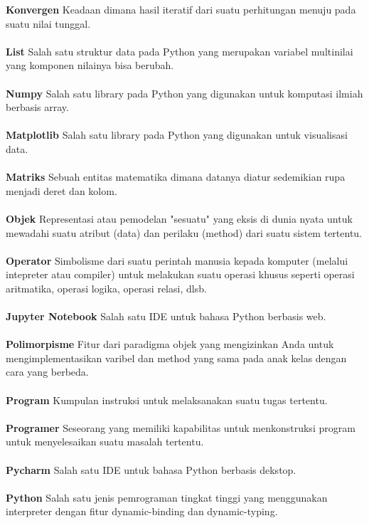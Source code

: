 \textbf{Konvergen} Keadaan dimana hasil iteratif dari suatu perhitungan menuju pada suatu nilai tunggal.\\ \\
\textbf{List} Salah satu struktur data pada Python yang merupakan variabel multinilai yang komponen nilainya bisa berubah.\\ \\
\textbf{Numpy} Salah satu library pada Python yang digunakan untuk komputasi ilmiah berbasis array.\\ \\
\textbf{Matplotlib} Salah satu library pada Python yang digunakan untuk visualisasi data.\\ \\
\textbf{Matriks} Sebuah entitas matematika dimana datanya diatur sedemikian rupa menjadi deret dan kolom.\\ \\
\textbf{Objek} Representasi atau pemodelan "sesuatu" yang eksis di dunia nyata untuk mewadahi suatu atribut (data) dan perilaku (method) dari suatu sistem tertentu.\\ \\
\textbf{Operator} Simbolisme dari suatu perintah manusia kepada komputer (melalui intepreter atau compiler) untuk melakukan suatu operasi khusus seperti operasi aritmatika, operasi logika, operasi relasi, dlsb.\\ \\
\textbf{Jupyter Notebook} Salah satu IDE untuk bahasa Python berbasis web.\\ \\
\textbf{Polimorpisme} Fitur dari paradigma objek yang mengizinkan Anda untuk mengimplementasikan varibel dan method yang sama pada anak kelas dengan cara yang berbeda.\\ \\
\textbf{Program} Kumpulan instruksi untuk melaksanakan suatu tugas tertentu.\\ \\
\textbf{Programer} Seseorang yang memiliki kapabilitas untuk menkonstruksi program untuk menyelesaikan suatu masalah tertentu.\\ \\
\textbf{Pycharm} Salah satu IDE untuk bahasa Python berbasis dekstop.\\ \\
\textbf{Python} Salah satu jenis pemrograman tingkat tinggi yang menggunakan interpreter dengan fitur dynamic-binding dan dynamic-typing.\\ \\
